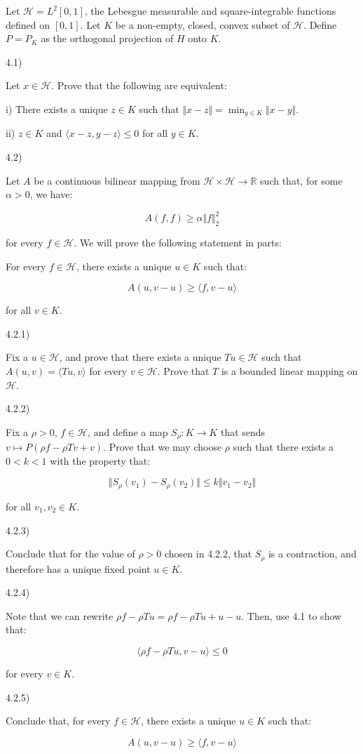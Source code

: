 \documentclass[10pt]{article}
\newenvironment{problem}[2][]{\begin{trivlist}
\item[\hskip \labelsep {\bfseries #1}\hskip \labelsep {\bfseries #2.}]}{\end{trivlist}}
\begin{document}
\begin{problem}{Question 4}

Let $\mathcal{H} = L^2[0,1]$, the Lebesgue measurable and square-integrable functions defined on $[0,1]$. Let $K$ be a non-empty, closed, convex subset of $\mathcal{H}$. Define $P = P_K$ as the orthogonal projection of $H$ onto $K$.

4.1)

Let $x \in \mathcal{H}$. Prove that the following are equivalent:

i) There exists a unique $z \in K$ such that $\Vert x - z \Vert = \min_{y \in K} \Vert x - y \Vert$.

ii) $z \in K$ and $\langle x - z, y - z \rangle \leq 0$ for all $y \in K$.

4.2)

Let $A$ be a continuous bilinear mapping from $\mathcal{H} \times \mathcal{H} \to \mathbb{R}$ such that, for some $\alpha > 0$, we have:

$$ A(f,f) \geq \alpha \Vert f \Vert_2^2 $$

for every $f \in \mathcal{H}$. We will prove the following statement in parts:

For every $f \in \mathcal{H}$, there exists a unique $u \in K$ such that:

$$ A(u, v-u) \geq \langle f, v - u \rangle $$

for all $v \in K$.

4.2.1)

Fix a $u \in \mathcal{H}$, and prove that there exists a unique $Tu \in \mathcal{H}$ such that $A(u,v) = \langle Tu, v \rangle$ for every $v \in \mathcal{H}$. Prove that $T$ is a bounded linear mapping on $\mathcal{H}$.

4.2.2)

Fix a $\rho > 0$, $f \in \mathcal{H}$, and define a map $S_\rho: K \to K$ that sends $v \mapsto P(\rho f - \rho Tv + v)$. Prove that we may choose $\rho$ such that there exists a $0 < k < 1$ with the property that:

$$ \Vert S_\rho(v_1) - S_\rho(v_2) \Vert \leq k \Vert v_1 - v_2 \Vert $$

for all $v_1, v_2 \in K$.

4.2.3)

Conclude that for the value of $\rho > 0$ chosen in 4.2.2, that $S_\rho$ is a contraction, and therefore has a unique fixed point $u \in K$.

4.2.4)

Note that we can rewrite $\rho f - \rho T u = \rho f - \rho T u + u - u$. Then, use 4.1 to show that:

$$ \langle \rho f - \rho Tu , v - u \rangle \leq 0 $$ 

for every $v \in K$.

4.2.5)

Conclude that, for every $f \in \mathcal{H}$, there exists a unique $u \in K$ such that:

$$ A(u, v-u) \geq \langle f, v - u \rangle $$

\end{problem}
\end{document}
